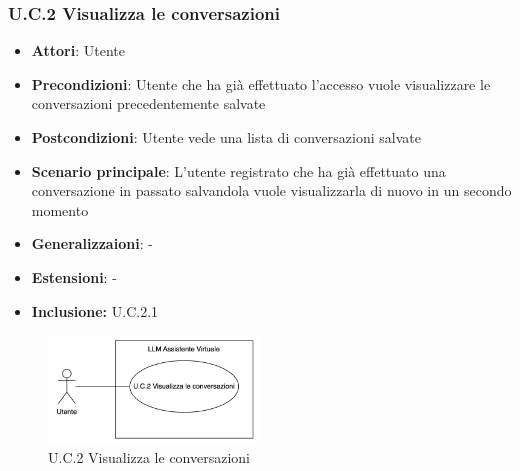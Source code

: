 \subsubsection{U.C.2 Visualizza le conversazioni}
\begin{itemize}
    \item \textbf{Attori}: Utente
    \item \textbf{Precondizioni}: Utente che ha già effettuato l’accesso vuole visualizzare le conversazioni precedentemente salvate
    \item \textbf{Postcondizioni}: Utente vede una lista di conversazioni salvate
    \item \textbf{Scenario principale}: L’utente registrato che ha già effettuato una conversazione in passato salvandola vuole visualizzarla di nuovo in un secondo momento
    \item \textbf{Generalizzaioni}: -
    \item \textbf{Estensioni}: -
    \item \textbf{Inclusione:} U.C.2.1
\end{itemize}
\begin{figure}[h!]
    \centering
    \includegraphics[width=0.5\textwidth]{img/UC2.png}
    \caption{U.C.2 Visualizza le conversazioni}
\end{figure}
